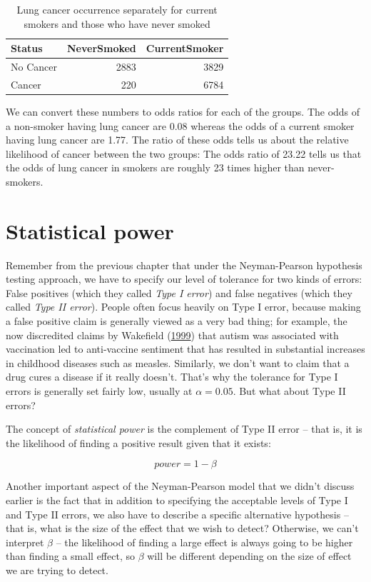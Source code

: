 \documentclass[12pt,]{book}
\theoremstyle{definition}
\theoremstyle{definition}
\theoremstyle{definition}
\theoremstyle{remark}
\begin{document}
\begin{table}

\caption{\label{tab:unnamed-chunk-55}Lung cancer occurrence separately for current smokers and those who have never smoked}
\centering
\begin{tabular}[t]{l|r|r}
\hline
Status & NeverSmoked & CurrentSmoker\\
\hline
No Cancer & 2883 & 3829\\
\hline
Cancer & 220 & 6784\\
\hline
\end{tabular}
\end{table}

We can convert these numbers to odds ratios for each of the groups. The odds of a non-smoker having lung cancer are 0.08 whereas the odds of a current smoker having lung cancer are 1.77. The ratio of these odds tells us about the relative likelihood of cancer between the two groups: The odds ratio of 23.22 tells us that the odds of lung cancer in smokers are roughly 23 times higher than never-smokers.

\hypertarget{statistical-power}{%
\section{Statistical power}\label{statistical-power}}

Remember from the previous chapter that under the Neyman-Pearson hypothesis testing approach, we have to specify our level of tolerance for two kinds of errors: False positives (which they called \emph{Type I error}) and false negatives (which they called \emph{Type II error}). People often focus heavily on Type I error, because making a false positive claim is generally viewed as a very bad thing; for example, the now discredited claims by Wakefield (\protect\hyperlink{ref-wake:1999}{1999}) that autism was associated with vaccination led to anti-vaccine sentiment that has resulted in substantial increases in childhood diseases such as measles. Similarly, we don't want to claim that a drug cures a disease if it really doesn't. That's why the tolerance for Type I errors is generally set fairly low, usually at \(\alpha = 0.05\). But what about Type II errors?

The concept of \emph{statistical power} is the complement of Type II error -- that is, it is the likelihood of finding a positive result given that it exists:

\[ 
power = 1 - \beta
\]

Another important aspect of the Neyman-Pearson model that we didn't discuss earlier is the fact that in addition to specifying the acceptable levels of Type I and Type II errors, we also have to describe a specific alternative hypothesis -- that is, what is the size of the effect that we wish to detect? Otherwise, we can't interpret \(\beta\) -- the likelihood of finding a large effect is always going to be higher than finding a small effect, so \(\beta\) will be different depending on the size of effect we are trying to detect.
\end{document}
